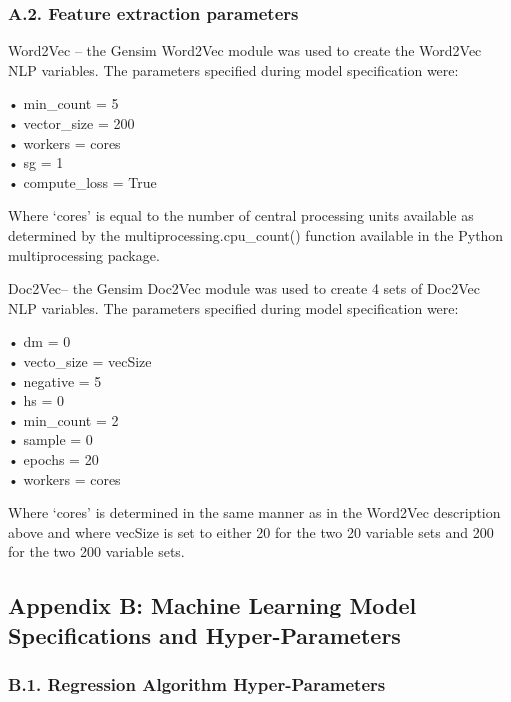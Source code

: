 \documentclass[11pt,preprint, authoryear]{elsarticle}
\numberwithin{equation}{section}
\numberwithin{figure}{section}
\numberwithin{table}{section}
\begin{document}
\hypertarget{a.2.-feature-extraction-parameters}{%
\subsubsection*{A.2. Feature extraction
parameters}\label{a.2.-feature-extraction-parameters}}

Word2Vec -- the Gensim Word2Vec module was used to create the Word2Vec
NLP variables. The parameters specified during model specification were:

• min\_count = 5\\
• vector\_size = 200\\
• workers = cores\\
• sg = 1\\
• compute\_loss = True

Where `cores' is equal to the number of central processing units
available as determined by the multiprocessing.cpu\_count() function
available in the Python multiprocessing package.

Doc2Vec-- the Gensim Doc2Vec module was used to create 4 sets of Doc2Vec
NLP variables. The parameters specified during model specification were:

• dm = 0\\
• vecto\_size = vecSize\\
• negative = 5\\
• hs = 0\\
• min\_count = 2\\
• sample = 0\\
• epochs = 20\\
• workers = cores

Where `cores' is determined in the same manner as in the Word2Vec
description above and where vecSize is set to either 20 for the two 20
variable sets and 200 for the two 200 variable sets.

\hypertarget{appendix-b-machine-learning-model-specifications-and-hyper-parameters}{%
\subsection*{Appendix B: Machine Learning Model Specifications and
Hyper-Parameters}\label{appendix-b-machine-learning-model-specifications-and-hyper-parameters}}

\hypertarget{b.1.-regression-algorithm-hyper-parameters}{%
\subsubsection*{B.1. Regression Algorithm
Hyper-Parameters}\label{b.1.-regression-algorithm-hyper-parameters}}
\end{document}
